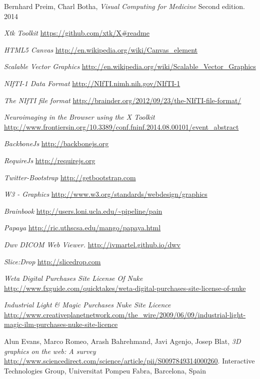 \documentclass[a4paper,11pt,titlepage]{article}
\begin{document}
  \begin{thebibliography}{1}

   Bernhard Preim, Charl Botha, {\em Visual Computing for Medicine} Second edition. 2014
  
    {\em Xtk Toolkit } \url{https://github.com/xtk/X#readme}
   
       {\em HTML5 Canvas} \url{http://en.wikipedia.org/wiki/Canvas_element}
   
       {\em    Scalable Vector Graphics} \url{http://en.wikipedia.org/wiki/Scalable_Vector_Graphics}

   
   
      {\em NIfTI-1 Data Format} \url{http://NIfTI.nimh.nih.gov/NIfTI-1}
     
	 {\em The NIfTI file format} \url{http://brainder.org/2012/09/23/the-NIfTI-file-format/} 
   
       {\em Neuroimaging in the Browser using the X Toolkit } \url{http://www.frontiersin.org/10.3389/conf.fninf.2014.08.00101/event_abstract} 

   {\em BackboneJs } \url{http://backbonejs.org} 
  
   {\em RequireJs } \url{http://requirejs.org} 
  
   {\em Twitter-Bootstrap } \url{http://getbootstrap.com} 	
  
   {\em W3 - Graphics } \url{http://www.w3.org/standards/webdesign/graphics}
  
   {\em Brainbook } \url{http://users.loni.ucla.edu/~pipeline/pain} 
  
   {\em Papaya } \url{http://ric.uthscsa.edu/mango/papaya.html} 
  
     {\em Dwv DICOM Web Viewer. } \url{http://ivmartel.github.io/dwv} 

     {\em Slice:Drop} \url{http://slicedrop.com} 
    
  
    
   {\em Weta Digital Purchases Site License Of Nuke } \url{http://www.fxguide.com/quicktakes/weta-digital-purchases-site-license-of-nuke} 
        
   {\em Industrial Light \& Magic Purchases Nuke Site Licence } \url{http://www.creativeplanetnetwork.com/the_wire/2009/06/09/industrial-light-magic-ilm-purchases-nuke-site-licence} 

     Alun Evans, Marco Romeo, Arash Bahrehmand, Javi Agenjo, Josep Blat, {\em 3D graphics on the web: A survey } \url{http://www.sciencedirect.com/science/article/pii/S0097849314000260}. Interactive Technologies Group, Universitat Pompeu Fabra, Barcelona, Spain


  \end{thebibliography}
\end{document}
